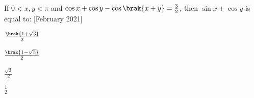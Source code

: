  
 \item If $0 < x,y < \pi$ and $\cos{x}+\cos{y}-\cos{\brak{x+y}}=\frac{3}{2}$, then $\sin{x}+\cos{y}$ is equal to: \hfill{[February 2021]}
 \begin{enumerate}
     \begin{multicols}{4}
         \item $\frac{\brak{1+\sqrt{3}}}{2}$
         \item $\frac{\brak{1-\sqrt{3}}}{2}$
         \item $\frac{\sqrt{3}}{2}$
         \item $\frac{1}{2}$
     \end{multicols}
 \end{enumerate}
